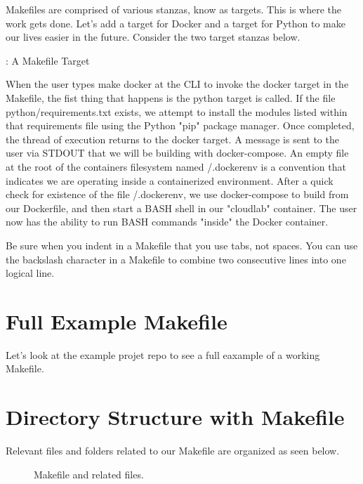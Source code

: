 \justify
Makefiles are comprised of various stanzas, know as targets. This is where the work gets done. Let's add a target for Docker and a target for
Python to make our lives easier in the future. Consider the two target stanzas below.

\justify
\begin{mybox}{\thetcbcounter: A Makefile Target}
	
\end{mybox}

\justify
When the user types make docker at the CLI to invoke the docker target
in the Makefile, the fist thing that happens is the python target is
called. If the file python/requirements.txt exists, we attempt to
install the modules listed within that requirements file using the
Python "pip" package manager. Once completed, the thread of execution
returns to the docker target. A message is sent to the user via STDOUT
that we will be building with docker-compose. An empty file at the root
of the containers filesystem named /.dockerenv is a convention that
indicates we are operating inside a containerized environment. After a
quick check for existence of the file /.dockerenv, we use docker-compose
to build from our Dockerfile, and then start a BASH shell in our
"cloudlab" container. The user now has the ability to run BASH commands
"inside" the Docker container.

\justify
Be sure when you indent in a Makefile that you use tabs, not spaces. You
can use the backslash character in a Makefile to combine two consecutive
lines into one logical line.

\section{Full Example Makefile}

Let's look at the example projet repo to see a full eaxample of a working Makefile.

\section{Directory Structure with Makefile}

\justify
Relevant files and folders related to our Makefile are organized as seen
below.

\begin{figure}[!htb]
	
	\caption{Makefile and related files.}
\end{figure}
